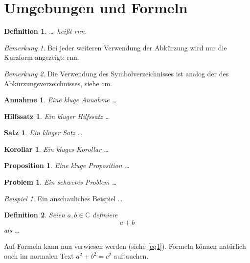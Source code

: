 \documentclass[12pt,DIV=15,BCOR=15mm,twoside,headsepline,abstract=true,listof=totoc,bibliography=totoc]{scrreprt}
\newtheorem{kor}{Korollar}
\newtheorem{hsatz}{Hilfssatz}
\newtheorem{satz}{Satz}
\newtheorem{prop}{Proposition}
\newtheorem{defi}{Definition}
\newtheorem{annahme}{Annahme}
\newtheorem{problem}{Problem}
\theoremstyle{remark}    %
\newtheorem{bem}{Bemerkung}
\newtheorem{bsp}{Beispiel}
\begin{document}
    \section{Umgebungen und Formeln}
    \begin{defi}
        \label{defi1}
        \dots\ heißt \ac{rnn}.
    \end{defi}
    \begin{bem}
        \label{bem1}
        Bei jeder weiteren Verwendung der Abkürzung wird nur die Kurzform angezeigt: \ac{rnn}.
    \end{bem}
    \begin{bem}
        \label{bem2}
        Die Verwendung des Symbolverzeichnisses ist analog der des Abkürzungsverzeichnisses, siehe \ac{cm}.
    \end{bem}
    \begin{annahme}
        \label{annahme1}
        Eine kluge Annahme \dots
    \end{annahme}
    \begin{hsatz}
        \label{hsatz1}
        Ein kluger Hilfssatz \dots
    \end{hsatz}
    \begin{satz}
        \label{satz1}
        Ein kluger Satz \dots
    \end{satz}
    \begin{kor}
        \label{kor1}
        Ein kluges Korollar \dots
    \end{kor}
    \begin{prop}
        \label{prop1}
        Eine kluge Proposition \dots
    \end{prop}
    \begin{problem}
        \label{problem1}
        Ein schweres Problem \dots
    \end{problem}
    \begin{bsp}
        \label{bsp1}
        Ein anschauliches Beispiel \dots
    \end{bsp}



    \begin{defi}
        \label{defi2}
        Seien $a,b\in\mathbb{C}$ definiere
        \begin{equation}
            \label{eq1}
            a+b
        \end{equation}
        als  \dots
    \end{defi}

    Auf Formeln kann nun verwiesen werden (siehe \eqref{eq1}). Formeln können natürlich auch im normalen Text $a^2+b^2=c^2$ auftauchen.
\end{document}

